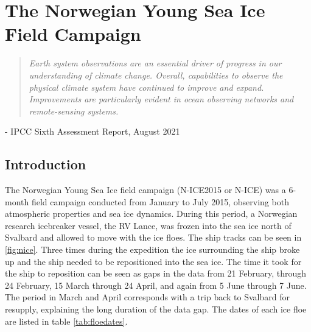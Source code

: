 \chapter{The Norwegian Young Sea Ice Field Campaign}
\vspace{1 cm}
\begin{spacing}{1} \begin{quote} 
\noindent \emph{Earth system observations are an essential driver of progress in our understanding of climate change. Overall, capabilities to observe the physical climate system have continued to improve and expand. Improvements are particularly evident in ocean observing networks and remote-sensing systems.} \end{quote}
\hspace{6 cm} - IPCC Sixth Assessment Report, August 2021  
\end{spacing}
\doublespacing
\section{Introduction}
The Norwegian Young Sea Ice field campaign (N-ICE2015 or N-ICE) was a 6-month field campaign conducted from January to July 2015, observing both atmospheric properties and sea ice dynamics. During this period, a Norwegian research icebreaker vessel, the RV Lance, was frozen into the sea ice north of Svalbard and allowed to move with the ice floes. The ship tracks can be seen in \ref{fig:nice}. Three times during the expedition the ice surrounding the ship broke up and the ship needed to be repositioned into the sea ice. The time it took for the ship to reposition can be seen as gaps in the data from 21 February, through 24 February, 15 March through 24 April, and again from 5 June through 7 June. The period in March and April corresponds with a trip back to Svalbard for resupply, explaining the long duration of the data gap. The dates of each ice floe are listed in table \ref{tab:floedates}. 

